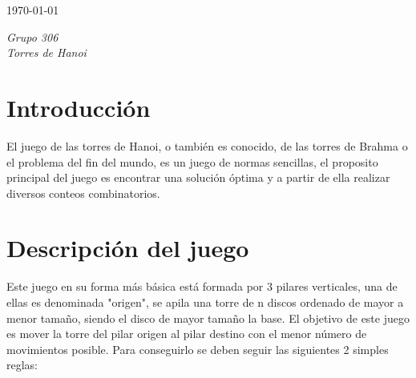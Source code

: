 \documentclass[letterpaper,12pt]{extarticle}%
\begin{document}
\begin{titlepage}
\begin{center}
\begin{center}
			\end{center}
			
			\vspace{1cm} \today
		\end{center}
	\end{titlepage}

    \newpage
    \tableofcontents
    \newpage
    
    \begin{center}
    {\it Grupo 306}\\[3mm]
    {\it Torres de Hanoi}\\[3mm]
    \end{center}
    


	\begin{multicols}{2}
    \section{Introducción}
		El juego de las torres de Hanoi, o también es conocido, de las torres de Brahma
		o el problema del fin del mundo, es un juego de normas sencillas, el proposito 
		principal del juego es encontrar una solución óptima y a partir de ella realizar 
		diversos conteos combinatorios.
		

        
    \section{Descripción del juego}
		Este juego en su forma más básica está formada por 3 pilares verticales,
		una de ellas es denominada "origen", se apila una torre de n discos ordenado
		de mayor a menor tamaño, siendo el disco de mayor tamaño la base.
		El objetivo de este juego es mover la torre del pilar origen al pilar destino
		con el menor número de movimientos posible.
		Para conseguirlo se deben seguir las siguientes 2 simples reglas:
    \begin{enumerate}
	

\end{enumerate}
\end{multicols}
\end{document}
